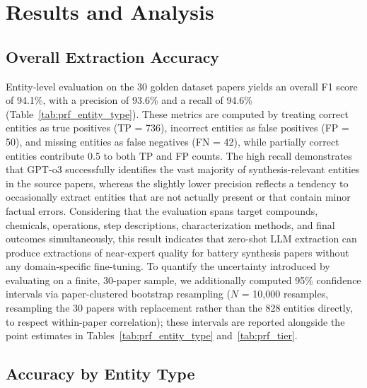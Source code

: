 \documentclass[12pt,a4paper]{article}
\begin{document}
\section{Results and Analysis}
\label{sec:results}

\subsection{Overall Extraction Accuracy}
\label{sec:accuracy}

Entity-level evaluation on the 30 golden dataset papers yields an overall F1 score of 94.1\%, with a precision of 93.6\% and a recall of 94.6\% (Table~\ref{tab:prf_entity_type}). These metrics are computed by treating correct entities as true positives (TP = 736), incorrect entities as false positives (FP = 50), and missing entities as false negatives (FN = 42), while partially correct entities contribute 0.5 to both TP and FP counts. The high recall demonstrates that GPT-o3 successfully identifies the vast majority of synthesis-relevant entities in the source papers, whereas the slightly lower precision reflects a tendency to occasionally extract entities that are not actually present or that contain minor factual errors. Considering that the evaluation spans target compounds, chemicals, operations, step descriptions, characterization methods, and final outcomes simultaneously, this result indicates that zero-shot LLM extraction can produce extractions of near-expert quality for battery synthesis papers without any domain-specific fine-tuning. To quantify the uncertainty introduced by evaluating on a finite, 30-paper sample, we additionally computed 95\% confidence intervals via paper-clustered bootstrap resampling ($N$ = 10,000 resamples, resampling the 30 papers with replacement rather than the 828 entities directly, to respect within-paper correlation); these intervals are reported alongside the point estimates in Tables~\ref{tab:prf_entity_type} and~\ref{tab:prf_tier}.

\subsection{Accuracy by Entity Type}
\label{sec:by_entity}
\end{document}
